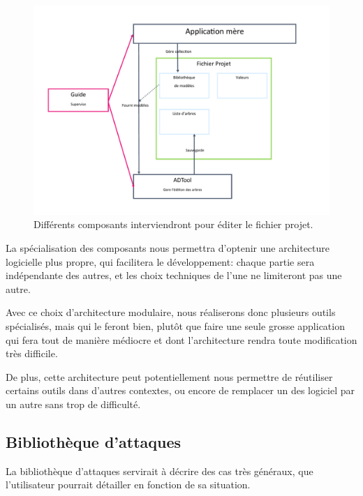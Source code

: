         \begin{figure}
            \begin{center}
                \includegraphics[width=1\textwidth]{figure/archi.pdf}
            \end{center}
            \caption{Différents composants interviendront pour éditer le fichier projet.}
            \label{fig:archi}
        \end{figure}

        La spécialisation des composants nous permettra d'optenir une architecture logicielle plus propre, qui facilitera le développement: chaque partie sera indépendante des autres, et les choix techniques de l'une ne limiteront pas une autre.

        Avec ce choix d'architecture modulaire, nous réaliserons donc plusieurs outils spécialisés, mais qui le feront bien, plutôt que faire une seule grosse application qui fera tout de manière médiocre et dont l'architecture rendra toute modification très difficile.
        
        De plus, cette architecture peut potentiellement nous permettre de réutiliser certains outils dans d'autres contextes, ou encore de remplacer un des logiciel par un autre sans trop de difficulté. 
    
    \subsection{Bibliothèque d'attaques}  
        \label{subsec:biblio_atk}
        La bibliothèque d'attaques servirait à décrire des cas très généraux, que l'utilisateur pourrait détailler en fonction de sa situation. 
        
